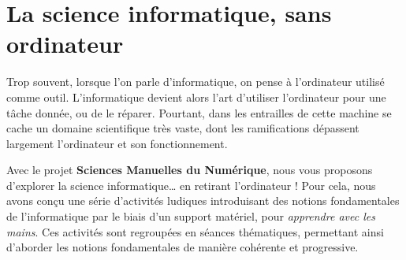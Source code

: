 \documentclass[a5paper,pagesize,DIV=14]{scrbook}
\begin{document}


\chapter*{La science informatique, sans ordinateur}


Trop souvent, lorsque l'on parle d'informatique, on pense à l'ordinateur utilisé
comme outil. L'informatique devient alors l'art d'utiliser l'ordinateur pour une
tâche donnée, ou de le réparer. Pourtant, dans les entrailles de cette machine
se cache un domaine scientifique très vaste, dont les ramifications dépassent
largement l'ordinateur et son fonctionnement.

Avec le projet \textbf{Sciences Manuelles du Numérique}, nous vous proposons
d'explorer la science informatique{\ldots} en retirant l'ordinateur ! Pour cela,
nous avons conçu une série d'activités ludiques introduisant des notions
fondamentales de l'informatique par le biais d'un support matériel, pour
\textit{apprendre avec les mains}. Ces activités sont regroupées en séances
thématiques, permettant ainsi d'aborder les notions fondamentales de manière
cohérente et progressive.
\end{document}
